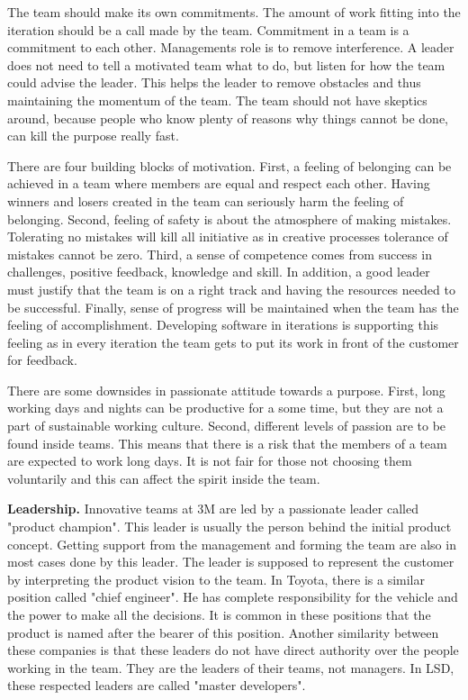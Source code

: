 The team should make its own commitments. The amount of work fitting into the iteration should be a call made by the team. Commitment in a team is a commitment to each other. Managements role is to remove interference. A leader does not need to tell a motivated team what to do, but listen for how the team could advise the leader. This helps the leader to remove obstacles and thus maintaining the momentum of the team. The team should not have skeptics around, because people who know plenty of reasons why things cannot be done, can kill the purpose really fast.

There are four building blocks of motivation. First, a feeling of belonging can be achieved in a team where members are equal and respect each other. Having winners and losers created in the team can seriously harm the feeling of belonging. Second, feeling of safety is about the atmosphere of making mistakes. Tolerating no mistakes will kill all initiative as in creative processes tolerance of mistakes cannot be zero. Third, a sense of competence comes from success in challenges, positive feedback, knowledge and skill. In addition, a good leader must justify that the team is on a right track and having the resources needed to be successful. Finally, sense of progress will be maintained when the team has the feeling of accomplishment. Developing software in iterations is supporting this feeling as in every iteration the team gets to put its work in front of the customer for feedback.

There are some downsides in passionate attitude towards a purpose. First, long working days and nights can be productive for a some time, but they are not a part of sustainable working culture. Second, different levels of passion are to be found inside teams. This means that there is a risk that the members of a team are expected to work long days. It is not fair for those not choosing them voluntarily and this can affect the spirit inside the team.

\textbf{Leadership.} Innovative teams at 3M are led by a passionate leader called "product champion". This leader is usually the person behind the initial product concept. Getting support from the management and forming the team are also in most cases done by this leader. The leader is supposed to represent the customer by interpreting the product vision to the team. In Toyota, there is a similar position called "chief engineer". He has complete responsibility for the vehicle and the power to make all the decisions. It is common in these positions that the product is named after the bearer of this position. Another similarity between these companies is that these leaders do not have direct authority over the people working in the team. They are the leaders of their teams, not managers. In LSD, these respected leaders are called "master developers".

